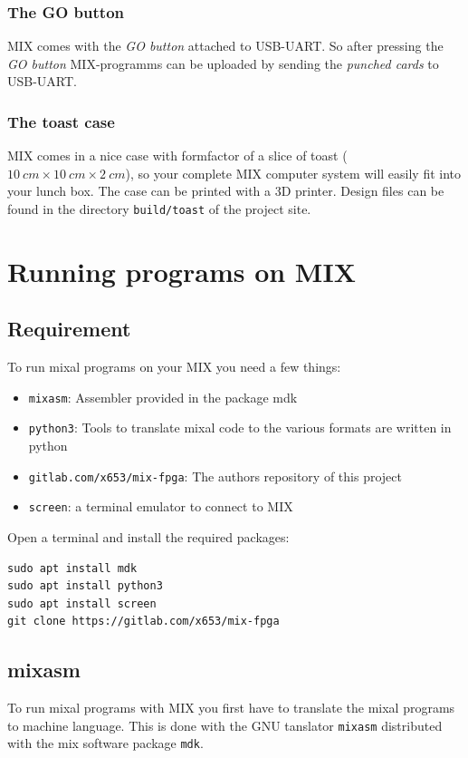 \documentclass[a4paper,ngerman]{scrartcl}
\begin{document}
\subsubsection{The GO button}
MIX comes with the \textit{GO button} attached to USB-UART. So after pressing the \textit{GO button} MIX-programms can be uploaded by sending the \textit{punched cards} to USB-UART.

\subsubsection{The toast case}
MIX comes in a nice case with formfactor of a slice of toast ($\SI{10}{cm} \times \SI{10}{cm} \times \SI{2}{cm}$), so your complete MIX computer system will easily fit into your lunch box. The case can be printed with a 3D printer. Design files can be found in the directory \lstinline|build/toast| of the project site.

\section{Running programs on MIX}
\subsection{Requirement}
To run mixal programs on your MIX you need a few things:
\begin{itemize}
	\item \lstinline|mixasm|: Assembler provided in the package mdk
	\item \lstinline|python3|: Tools to translate mixal code to the various formats are written in python
	\item \lstinline|gitlab.com/x653/mix-fpga|: The authors repository of this project
	\item \lstinline|screen|: a terminal emulator to connect to MIX
\end{itemize}

Open a terminal and install the required packages:

\begin{lstlisting}[numbers=none,frame=none]
sudo apt install mdk
sudo apt install python3
sudo apt install screen
git clone https://gitlab.com/x653/mix-fpga
\end{lstlisting}

\subsection{mixasm}
To run mixal programs with MIX you first have to translate the mixal programs to machine language. This is done with the GNU tanslator \lstinline|mixasm| distributed with the mix software package  \lstinline|mdk|.
\end{document}
